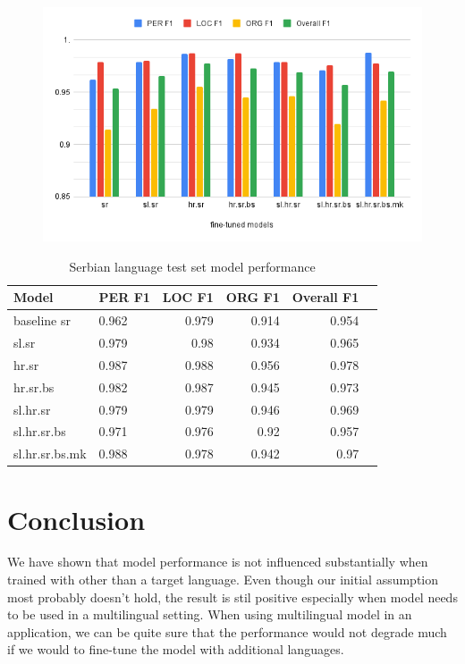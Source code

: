 \documentclass[sigconf]{acmart}
\begin{document}
\begin{figure}[h]
  \label{fig:eval_sr}
  \centering
  \includegraphics[width=\linewidth]{eval_sr}
\end{figure}

\begin{table}[H]
  \caption{Serbian language test set model performance}
  \label{tab:eval_sr}
  \begin{tabular}{llrrrr}
    \toprule
    Model&PER F1&LOC F1&ORG F1&Overall F1\\
    \midrule
    baseline sr&0.962&0.979&0.914&0.954\\
    \midrule
    sl.sr&0.979&0.98&0.934&0.965\\
    hr.sr&0.987&0.988&0.956&0.978\\
    hr.sr.bs&0.982&0.987&0.945&0.973\\
    sl.hr.sr&0.979&0.979&0.946&0.969\\
    sl.hr.sr.bs&0.971&0.976&0.92&0.957\\
    sl.hr.sr.bs.mk&0.988&0.978&0.942&0.97\\
    \bottomrule
  \end{tabular}
\end{table}

\section{Conclusion}
We have shown that model performance is not influenced substantially when trained with other than a target language.
Even though our initial assumption most probably doesn't hold, the result is stil positive especially when model needs to be used in a multilingual setting.
When using multilingual model in an application, we can be quite sure that the performance would not degrade much if we would to fine-tune the model with additional languages.
\end{document}
